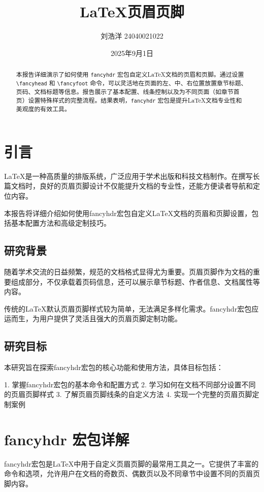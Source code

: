 \documentclass[12pt,a4paper]{report}
\title{LaTeX页眉页脚}
\author{刘浩洋 24040021022}
\date{2025年9月1日}
\begin{document}
\maketitle

\thispagestyle{empty}

\begin{abstract}
\thispagestyle{fancy} %
本报告详细演示了如何使用 \texttt{fancyhdr} 宏包自定义LaTeX文档的页眉和页脚。通过设置 \texttt{\textbackslash fancyhead} 和 \texttt{\textbackslash fancyfoot} 命令，可以灵活地在页面的左、中、右位置放置章节标题、页码、文档标题等信息。报告展示了基本配置、线条控制以及为不同页面（如章节首页）设置特殊样式的完整流程。结果表明，\texttt{fancyhdr} 宏包是提升LaTeX文档专业性和美观度的有效工具。
\end{abstract}

\tableofcontents
\thispagestyle{fancy} %

\chapter{引言}
LaTeX是一种高质量的排版系统，广泛应用于学术出版和科技文档制作。在撰写长篇文档时，良好的页眉页脚设计不仅能提升文档的专业性，还能方便读者导航和定位内容。

本报告将详细介绍如何使用fancyhdr宏包自定义LaTeX文档的页眉和页脚设置，包括基本配置方法和高级定制技巧。

\section{研究背景}
随着学术交流的日益频繁，规范的文档格式显得尤为重要。页眉页脚作为文档的重要组成部分，不仅承载着页码信息，还可以展示章节标题、作者信息、文档属性等内容。

传统的LaTeX默认页眉页脚样式较为简单，无法满足多样化需求。fancyhdr宏包应运而生，为用户提供了灵活且强大的页眉页脚定制功能。

\section{研究目标}
本研究旨在探索fancyhdr宏包的核心功能和使用方法，具体目标包括：

1. 掌握fancyhdr宏包的基本命令和配置方式
2. 学习如何在文档不同部分设置不同的页眉页脚样式
3. 了解页眉页脚线条的自定义方法
4. 实现一个完整的页眉页脚定制案例

\chapter{fancyhdr 宏包详解}
fancyhdr宏包是LaTeX中用于自定义页眉页脚的最常用工具之一。它提供了丰富的命令和选项，允许用户在文档的奇数页、偶数页以及不同章节中设置不同的页眉页脚内容。
\end{document}
